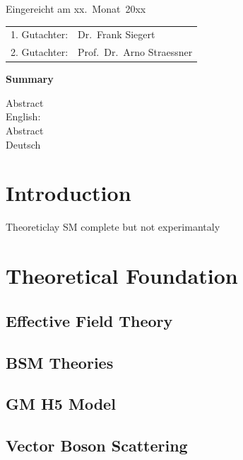    
   \thispagestyle{empty}\vspace*{48em}
   
   Eingereicht am xx.~Monat~20xx\vspace{1.5em}
   \par{\large\begin{tabular}{ll}
    1. Gutachter: & Dr.~Frank Siegert \\
    2. Gutachter: & Prof.~Dr.~Arno Straessner  \\
   \end{tabular}}
   
   
   \newpage
   \begin{center}\large\bfseries Summary\end{center}
   
   
   Abstract \\ 
   English: \\
   
   \vspace{20em}
   Abstract \\ 
   Deutsch \\
    
    
\tableofcontents

\pagebreak
\chapter{Introduction}
    
    Theoreticlay SM complete but not experimantaly
\chapter{Theoretical Foundation}
    \section{Effective Field Theory}
        
        
    \section{BSM Theories}
        
    \section{GM H5 Model}
        
    

    \section{Vector Boson Scattering}
        
 
